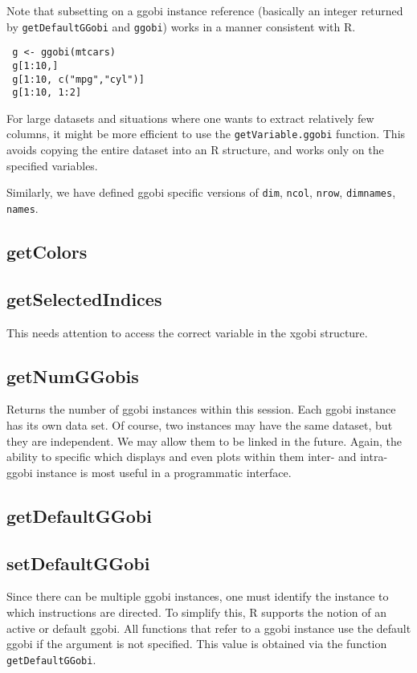 \documentclass{article}
\def\SFunction#1{{\texttt{\red #1}}}
\begin{document}
Note that subsetting on a ggobi instance reference (basically an
integer returned by \SFunction{getDefaultGGobi} and \SFunction{ggobi})
works in a manner consistent with R.
\begin{verbatim}
 g <- ggobi(mtcars)
 g[1:10,]
 g[1:10, c("mpg","cyl")]
 g[1:10, 1:2]
\end{verbatim}
For large datasets and situations where one wants to extract
relatively few columns, it might be more efficient to use the
\SFunction{getVariable.ggobi} function.
This avoids copying the entire dataset into an R structure,
and works only on the specified variables.

Similarly, we have defined ggobi specific
versions of \SFunction{dim}, \SFunction{ncol},
\SFunction{nrow}, \SFunction{dimnames},
\SFunction{names}.


\subsection{getColors}


\subsection{getSelectedIndices}
This needs attention to access the correct
variable in the xgobi structure.


\subsection{getNumGGobis}
Returns the number of ggobi instances within this session.  Each ggobi
instance has its own data set. Of course, two instances may have the
same dataset, but they are independent.  We may allow them to be
linked in the future.  Again, the ability to specific which displays
and even plots within them inter- and intra- ggobi instance is most
useful in a programmatic interface.

\subsection{getDefaultGGobi}
\subsection{setDefaultGGobi}
Since there can be multiple ggobi instances, one must identify the
instance to which instructions are directed.  To simplify this, R
supports the notion of an active or default ggobi.  All functions that
refer to a ggobi instance use the default ggobi if the 
argument is not specified.  This value is obtained via the function
\SFunction{getDefaultGGobi}.
\end{document}
